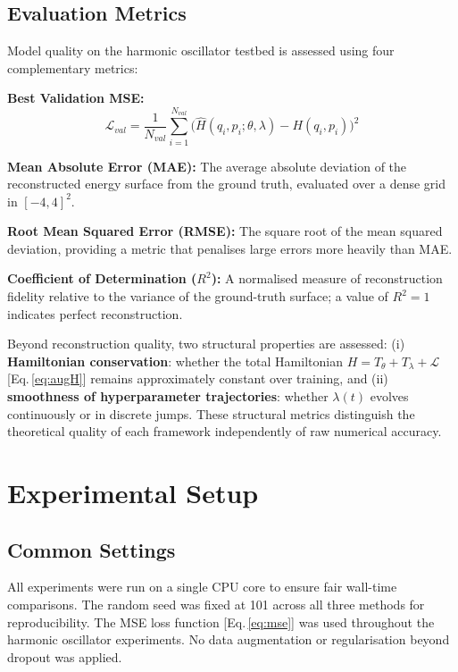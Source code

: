 \documentclass[11pt]{article}
\begin{document}
\subsection{Evaluation Metrics}

Model quality on the harmonic oscillator testbed is assessed using four
complementary metrics:

\textbf{Best Validation MSE:}
\begin{equation}
\mathcal{L}_{val} = \frac{1}{N_{val}}\sum_{i=1}^{N_{val}}
  \bigl(\hat{H}(q_i,p_i;\theta,\lambda) - H(q_i,p_i)\bigr)^2
\label{eq:mse}
\end{equation}

\textbf{Mean Absolute Error (MAE):}  The average absolute deviation
of the reconstructed energy surface from the ground truth, evaluated
over a dense grid in $[-4,4]^2$.

\textbf{Root Mean Squared Error (RMSE):}  The square root of the
mean squared deviation, providing a metric that penalises large errors
more heavily than MAE.

\textbf{Coefficient of Determination ($R^2$):}  A normalised measure
of reconstruction fidelity relative to the variance of the ground-truth
surface; a value of $R^2 = 1$ indicates perfect reconstruction.

Beyond reconstruction quality, two structural properties are assessed:
(i) \textbf{Hamiltonian conservation}: whether the total Hamiltonian
$H = T_\theta + T_\lambda + \mathcal{L}$ [Eq.\,\eqref{eq:augH}] remains
approximately constant over training, and (ii)
\textbf{smoothness of hyperparameter trajectories}: whether $\lambda(t)$
evolves continuously or in discrete jumps.  These structural metrics
distinguish the theoretical quality of each framework independently of
raw numerical accuracy.


\section{Experimental Setup}
\label{sec:setup}

\subsection{Common Settings}

All experiments were run on a single CPU core to ensure fair
wall-time comparisons.  The random seed was fixed at 101 across all
three methods for reproducibility.  The MSE loss function
[Eq.\,\eqref{eq:mse}] was used throughout the harmonic oscillator
experiments.  No data augmentation or regularisation beyond dropout
was applied.
\end{document}
